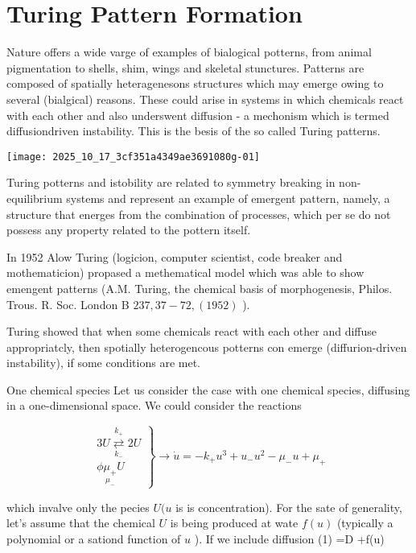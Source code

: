 \section{Turing Pattern Formation}
Nature offers a wide varge of examples of bialogical potterns, from animal pigmentation to shells, shim, wings and skeletal stunctures. Patterns are composed of spatially heteragenesons structures which may emerge owing to several (bialgical) reasons. These could arise in systems in which chemicals react with each other and also underswent diffusion - a mechonism which is termed diffusiondriven instability. This is the besis of the so called Turing patterns.
\begin{center}
\texttt{[image: 2025\_10\_17\_3cf351a4349ae3691080g-01]}
\end{center}

Turing potterns and istobility are related to symmetry breaking in non-equilibrium systems and represent an example of emergent pattern, namely, a structure that energes from the combination of processes, which per se do not possess any property related to the pottern itself.

In 1952 Alow Turing (logicion, computer scientist, code breaker and mothematicion) propased a methematical model which was able to show emengent patterns (A.M. Turing, the chemical basis of morphogenesis, Philos. Trous. R. Soc. London B $237,37-72,(1952)$ ).

Turing showed that when some chemicals react with each other and diffuse appropriatcly, then spotially heterogencous potterns con emerge (diffurion-driven instability), if some conditions are met.

One chemical species
Let us consider the case with one chemical species, diffusing in a one-dimensional space. We could consider the reactions

$$
\left.\begin{array}{l}
3 U \underset{k_{-}}{\stackrel{k_{+}}{\rightleftarrows}} 2 U \\ 
\phi \underset{\mu_{-}}{\mu_{+}} U
\end{array}\right\} \rightarrow \dot{u}=-k_{+} u^{3}+u_{-} u^{2}-\mu_{-} u+\mu_{+}
$$

which invalve only the pecies $U(u$ is is concentration).
For the sate of generality, let's assume that the chemical $U$ is being produced at wate $f(u)$ (typically a polynomial or a sationd function of $u$ ). If we include diffusion
(1) \quad {}=D +f(u)

